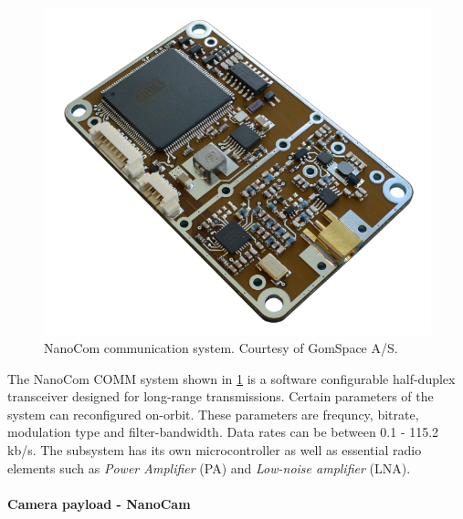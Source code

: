 \documentclass[english,12pt,a4paper,pdftex,elec,utf8]{aaltothesis}
\begin{document}
\begin{figure}[h!]
\centering
\includegraphics[scale=0.2]{nanocomm_pcb}
\caption{NanoCom communication system. Courtesy of GomSpace A/S. \cite{nanocomds}}
\label{nanocom}
\end{figure} 
The NanoCom COMM system shown in \ref{nanocom} is a software configurable half-duplex transceiver designed for long-range transmissions. Certain parameters of the system can reconfigured on-orbit. These parameters are frequncy, bitrate, modulation type and filter-bandwidth. Data rates can be between 0.1 - 115.2 kb/s. The subsystem has its own microcontroller as well as essential radio elements such as \textit{Power Amplifier} (PA) and \textit{Low-noise amplifier} (LNA). \cite{nanocomds} 
\\
\\
\textbf{Camera payload - NanoCam}\par 
\end{document}
